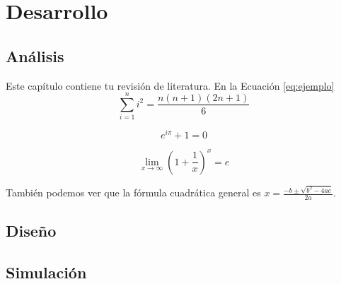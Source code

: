 \chapter{Desarrollo}
\section{Análisis}
Este capítulo contiene tu revisión de literatura. En la Ecuación \ref{eq:ejemplo}
\begin{equation}
  \sum_{i=1}^{n} i^2 = \frac{n(n+1)(2n+1)}{6}
\end{equation}

\begin{equation}
  e^{i\pi} + 1 = 0
\end{equation}

\begin{equation}
  \lim_{x \to \infty} \left(1 + \frac{1}{x}\right)^x = e
  \label{eq:ejemplo}
\end{equation}

También podemos ver que la fórmula cuadrática general es $x = \frac{-b \pm \sqrt{b^2 - 4ac}}{2a}$.

\section{Diseño}


\section{Simulación}


